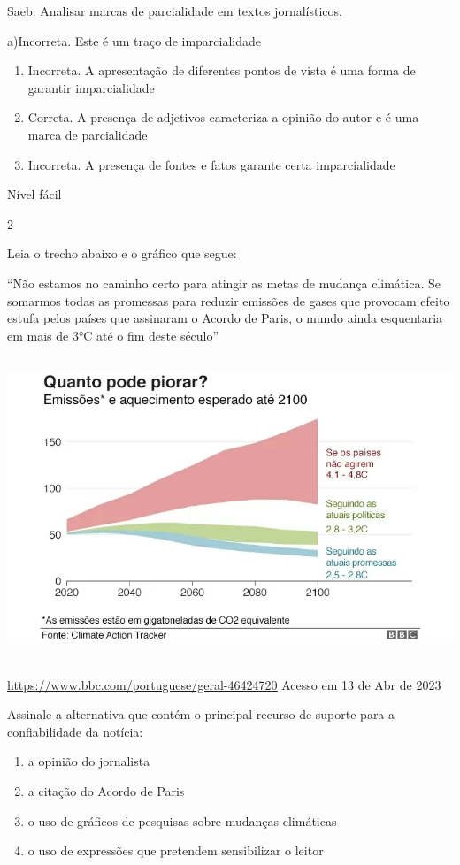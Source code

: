 {{\begin{escolha}
Saeb: Analisar marcas de parcialidade em textos jornalísticos.

a)Incorreta. Este é um traço de imparcialidade

\begin{enumerate}
\def\labelenumi{\arabic{enumi}.}
\item
  Incorreta. A apresentação de diferentes pontos de vista é uma forma de
  garantir imparcialidade
\item
  Correta. A presença de adjetivos caracteriza a opinião do autor e é
  uma marca de parcialidade
\item
  Incorreta. A presença de fontes e fatos garante certa imparcialidade
\end{enumerate}

Nível fácil

\num{2}

Leia o trecho abaixo e o gráfico que segue:

``Não estamos no caminho certo para atingir as metas de mudança
climática. Se somarmos todas as promessas para reduzir emissões de gases
que provocam efeito estufa pelos países que assinaram o Acordo de Paris,
o mundo ainda esquentaria em mais de 3°C até o fim deste século''

\includegraphics[width=5.90551in,height=3.56944in]{./imgSAEB_7_POR/media/image8.png}

\href{https://www.bbc.com/portuguese/geral-46424720}{\uline{https://www.bbc.com/portuguese/geral-46424720}}
Acesso em 13 de Abr de 2023

Assinale a alternativa que contém o principal recurso de suporte para a
confiabilidade da notícia:

\begin{enumerate}
\def\labelenumi{\alph{enumi})}
\item
  a opinião do jornalista
\item
  a citação do Acordo de Paris
\item
  o uso de gráficos de pesquisas sobre mudanças climáticas
\item
  o uso de expressões que pretendem sensibilizar o leitor
\end{enumerate}


\end{escolha}}}
